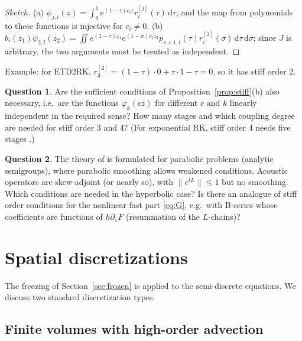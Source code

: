 \documentclass[11pt,a4paper]{article}
\theoremstyle{definition}
\newtheorem{question}{Question}
\theoremstyle{remark}
\newcommand{\dd}{\,\mathrm{d}}
\begin{document}
\begin{proof}[Sketch]
(a) $\psi_{j,i}(z)=\int_0^1e^{(1-\tau)c_iz}r_i^{[j]}(\tau)\dd\tau$,
and the map from polynomials to these functions is injective for
$c_i\neq0$. (b) $b_i(z_1)\psi_{2,i}(z_2)
=\iint e^{(1-\tau)z_1}e^{(1-\sigma)c_iz_2}p_{s+1,i}(\tau)r_i^{[2]}(\sigma)\dd\tau\dd\sigma$;
since $J$ is arbitrary, the two arguments must be treated as independent.
\end{proof}

Example: for ETD2RK, $r_3^{[2]}=(1-\tau)\cdot0+\tau\cdot1-\tau=0$,
so it has stiff order 2.

\begin{question}
Are the sufficient conditions of Proposition~\ref{prop:stiff}(b) also
necessary, i.e.\ are the functions $\varphi_k(cz)$ for different $c$ and
$k$ linearly independent in the required sense? How many stages and which
coupling degree are needed for stiff order 3 and 4? (For exponential RK,
stiff order 4 needs five stages \cite{HochbruckOstermann2005}.)
\end{question}

\begin{question}
The theory of \cite{HochbruckOstermann2005} is formulated for parabolic
problems (analytic semigroups), where parabolic smoothing allows weakened
conditions. Acoustic operators are skew-adjoint (or nearly so), with
$\|e^{tL}\|\le1$ but no smoothing. Which conditions are needed in the
hyperbolic case? Is there an analogue of stiff order conditions for the
nonlinear fast part \eqref{eq:G}, e.g.\ with B-series whose coefficients
are functions of $h\partial_zF$ (resummation of the $L$-chains)?
\end{question}

\section{Spatial discretizations}
\label{sec:discretization}

The freezing of Section~\ref{sec:frozen} is applied to the
semi-discrete equations. We discuss two standard discretization types.

\subsection{Finite volumes with high-order advection}
\end{document}
